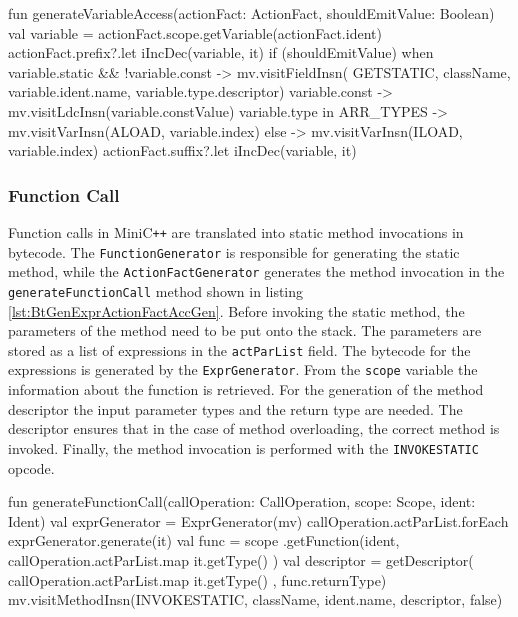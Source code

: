 \begin{KotlinCode}[float,numbers=none,caption=Implementation of the \texttt{generateVariableAccess} method of the \texttt{ActionFactGenerator}., label=lst:BtGenExprActionFactVarAccGen]
fun generateVariableAccess(actionFact: ActionFact, shouldEmitValue: Boolean) {
    val variable = actionFact.scope.getVariable(actionFact.ident)
    actionFact.prefix?.let {   iIncDec(variable, it)    }
    if (shouldEmitValue) {
        when {
            variable.static && !variable.const -> mv.visitFieldInsn(
                GETSTATIC, className, variable.ident.name, variable.type.descriptor)
            variable.const -> mv.visitLdcInsn(variable.constValue)
            variable.type in ARR_TYPES -> mv.visitVarInsn(ALOAD, variable.index)
            else -> mv.visitVarInsn(ILOAD, variable.index)
        }
    }
    actionFact.suffix?.let {   iIncDec(variable, it)    }
}
\end{KotlinCode}

\subsubsection{Function Call}

Function calls in MiniC\verb|++| are translated into static method invocations in bytecode. The \verb|FunctionGenerator| is responsible for generating the static method, while the \verb|ActionFactGenerator| generates the method invocation in the \verb|generateFunctionCall| method shown in listing \ref{lst:BtGenExprActionFactAccGen}. Before invoking the static method, the parameters of the method need to be put onto the stack. The parameters are stored as a list of expressions in the \verb|actParList| field. The bytecode for the expressions is generated by the \verb|ExprGenerator|. From the \verb|scope| variable the information about the function is retrieved. For the generation of the method descriptor the input parameter types and the return type are needed. The descriptor ensures that in the case of method overloading, the correct method is invoked. Finally, the method invocation is performed with the \verb|INVOKESTATIC| opcode. 

\begin{KotlinCode}[float,numbers=none,caption=Implementation of the \texttt{generateFunctionCall} method of the \texttt{ActionFactGenerator}., label=lst:BtGenExprActionFactAccGen]
fun generateFunctionCall(callOperation: CallOperation, scope: Scope, ident: Ident) {
    val exprGenerator = ExprGenerator(mv)
    callOperation.actParList.forEach {
        exprGenerator.generate(it)
    }
    val func = scope
    .getFunction(ident, callOperation.actParList.map { it.getType() })
    val descriptor = getDescriptor(
        callOperation.actParList.map { it.getType() }, func.returnType)
    mv.visitMethodInsn(INVOKESTATIC, className, ident.name, descriptor, false)
}

\end{KotlinCode}



